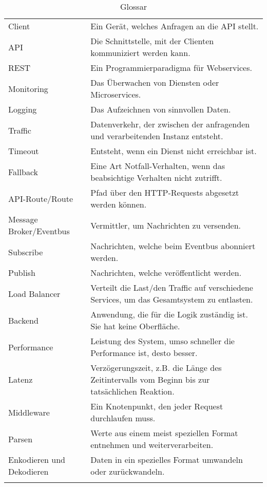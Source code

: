 \begin{longtable}{lp{10cm}}
	Client & Ein Gerät, welches Anfragen an die API stellt. \\
	API & Die Schnittstelle, mit der Clienten kommuniziert werden kann.\\
	REST & Ein Programmierparadigma für Webservices. \\
	Monitoring & Das Überwachen von Diensten oder Microservices.\\
	Logging & Das Aufzeichnen von sinnvollen Daten.\\
	Traffic & Datenverkehr, der zwischen der anfragenden und verarbeitenden Instanz entsteht.\\
	Timeout & Entsteht, wenn ein Dienst nicht erreichbar ist.\\
	Fallback & Eine Art Notfall-Verhalten, wenn das beabsichtige Verhalten nicht zutrifft.\\
	API-Route/Route & Pfad über den HTTP-Requests abgesetzt werden können.\\
	Message Broker/Eventbus & Vermittler, um Nachrichten zu versenden.  \\
	Subscribe & Nachrichten, welche beim Eventbus abonniert werden. \\
	Publish & Nachrichten, welche veröffentlicht werden. \\
	Load Balancer & Verteilt die Last/den Traffic auf verschiedene Services, um das Gesamtsystem zu entlasten.\\
	Backend & Anwendung, die für die Logik zuständig ist. Sie hat keine Oberfläche.\\
	Performance & Leistung des System, umso schneller die Performance ist, desto besser.\\
	Latenz & Verzögerungszeit, z.B. die Länge des Zeitintervalls vom Beginn bis zur tatsächlichen Reaktion.\\
	Middleware & Ein Knotenpunkt, den jeder Request durchlaufen muss. \\
	Parsen & Werte aus einem meist speziellen Format entnehmen und weiterverarbeiten. \\ 
	Enkodieren und Dekodieren & Daten in ein spezielles Format umwandeln oder zurückwandeln.\\
	\caption[Glossar]{Glossar}
\end{longtable}
